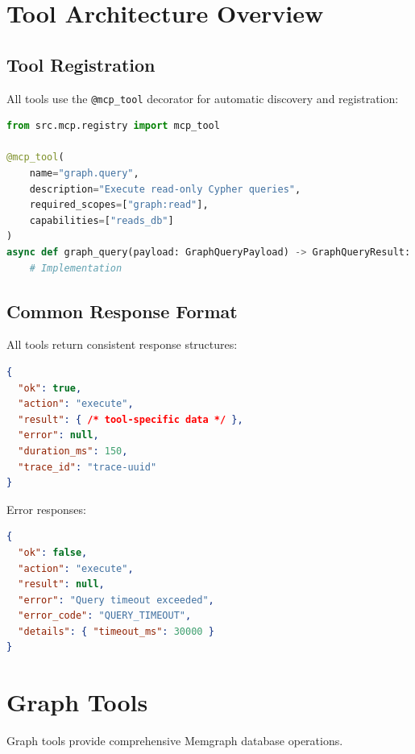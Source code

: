 \documentclass[a4paper,twoside]{sapthesis}
\begin{document}
\section{Tool Architecture Overview}
\label{app:tools:overview}

\subsection{Tool Registration}

All tools use the \texttt{@mcp\_tool} decorator for automatic discovery and registration:

\begin{lstlisting}[language=Python]
from src.mcp.registry import mcp_tool

@mcp_tool(
    name="graph.query",
    description="Execute read-only Cypher queries",
    required_scopes=["graph:read"],
    capabilities=["reads_db"]
)
async def graph_query(payload: GraphQueryPayload) -> GraphQueryResult:
    # Implementation
\end{lstlisting}

\subsection{Common Response Format}

All tools return consistent response structures:

\begin{lstlisting}[language=json]
{
  "ok": true,
  "action": "execute",
  "result": { /* tool-specific data */ },
  "error": null,
  "duration_ms": 150,
  "trace_id": "trace-uuid"
}
\end{lstlisting}

Error responses:

\begin{lstlisting}[language=json]
{
  "ok": false,
  "action": "execute",
  "result": null,
  "error": "Query timeout exceeded",
  "error_code": "QUERY_TIMEOUT",
  "details": { "timeout_ms": 30000 }
}
\end{lstlisting}

\section{Graph Tools}
\label{app:tools:graph}

Graph tools provide comprehensive Memgraph database operations.
\end{document}

